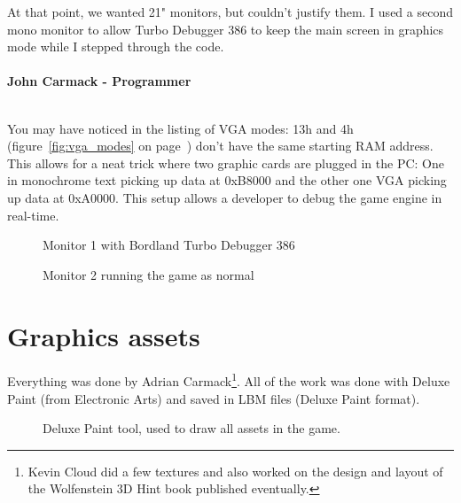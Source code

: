 \documentclass[book.tex]{subfiles}
\begin{document}
\begin{fancyquotes}
At that point, we wanted 21" monitors, but couldn't justify them.  I used a second mono monitor to allow Turbo Debugger 386 to keep the main screen in graphics mode while I stepped through the code.\\
 \\
\textbf{John Carmack - Programmer}
\end{fancyquotes}
\\
You may have noticed in the listing of VGA modes: 13h and 4h (figure~\ref{fig:vga_modes} on page~\pageref{fig:vga_modes})  don't have the same starting RAM address. This allows for a neat trick where two graphic cards are plugged in the PC: One in monochrome text picking up data at 0xB8000 and the other one VGA picking up data at 0xA0000. This setup allows a developer to debug the game engine in real-time.\\
\begin{figure}[H]
\centering
\caption{Monitor 1 with Bordland Turbo Debugger 386}
\label{fig:dm1}
\end{figure}

\begin{figure}[H]
\centering
\caption{Monitor 2 running the game as normal}
\label{fig:dm1}
\end{figure}



 
 
 




\section{Graphics assets}

Everything was done by Adrian Carmack\footnote{Kevin Cloud did a few textures and also worked on the design and layout of the Wolfenstein 3D Hint book published eventually.}. All of the work was done with Deluxe Paint (from Electronic Arts) and saved in LBM files (Deluxe Paint format). 

\begin{figure}[H]
  \centering
 \caption{Deluxe Paint tool, used to draw all assets in the game.}
\end{figure}
\end{document}
